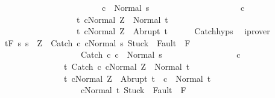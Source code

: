 \begin{isabellebody}
\ \ \ \ \ \ \ \ \ \ \ \ \ \ \ \ \ \ \ \ \ \ \ \ {\isasymGamma}{\isasymturnstile}c\ {\isasymdown}\ Normal\ s{\isacharbraceright}\ \isanewline
\ \ \ \ \ \ \ \ \ \ \ \ \ \ \ \ \ \ \ \ c\isanewline
\ \ \ \ \ \ \ \ \ \ \ \ \ \ \ \ \ \ {\isacharbraceleft}t{\isachardot}\ {\isasymGamma}{\isasymturnstile}{\isasymlangle}cNormal\ Z{\isasymrangle}\ {\isasymRightarrow}\ Normal\ t{\isacharbraceright}{\isacharcomma}\isanewline
\ \ \ \ \ \ \ \ \ \ \ \ \ \ \ \ \ \ {\isacharbraceleft}t{\isachardot}\ {\isasymGamma}{\isasymturnstile}{\isasymlangle}cNormal\ Z{\isasymrangle}\ {\isasymRightarrow}\ Abrupt\ t{\isacharbraceright}{\isachardoublequoteclose}\isanewline
\ \ \ \ \isamarkupfalse%
\ Catch{\isachardot}hyps\ \isamarkupfalse%
\ iprover\isanewline
\ \ \isamarkupfalse%
\ {\isachardoublequoteopen}{\isasymGamma}{\isacharcomma}{\isasymTheta}{\isasymturnstile}\isactrlsub t\isactrlbsub {\isacharslash}F\isactrlesub \ {\isacharbraceleft}s{\isachardot}\ s\ {\isacharequal}\ Z\ {\isasymand}\ {\isasymGamma}{\isasymturnstile}{\isasymlangle}Catch\ c\ cNormal\ s{\isasymrangle}\ {\isasymRightarrow}{\isasymnotin}{\isacharparenleft}{\isacharbraceleft}Stuck{\isacharbraceright}\ {\isasymunion}\ Fault\ {\isacharbackquote}\ {\isacharparenleft}{\isacharminus}F{\isacharparenright}{\isacharparenright}\ {\isasymand}\ \isanewline
\ \ \ \ \ \ \ \ \ \ \ \ \ \ \ \ \ \ \ {\isasymGamma}{\isasymturnstile}Catch\ c\ c\ {\isasymdown}\ Normal\ s{\isacharbraceright}\ \isanewline
\ \ \ \ \ \ \ \ \ \ \ \ \ \ \ \ c\isanewline
\ \ \ \ \ \ \ \ \ \ \ \ \ \ \ {\isacharbraceleft}t{\isachardot}\ {\isasymGamma}{\isasymturnstile}{\isasymlangle}Catch\ c\ cNormal\ Z{\isasymrangle}\ {\isasymRightarrow}\ Normal\ t{\isacharbraceright}{\isacharcomma}\isanewline
\ \ \ \ \ \ \ \ \ \ \ \ \ \ \ {\isacharbraceleft}t{\isachardot}\ {\isasymGamma}{\isasymturnstile}{\isasymlangle}cNormal\ Z{\isasymrangle}\ {\isasymRightarrow}\ Abrupt\ t\ {\isasymand}\ {\isasymGamma}{\isasymturnstile}c\ {\isasymdown}\ Normal\ t\ {\isasymand}\isanewline
\ \ \ \ \ \ \ \ \ \ \ \ \ \ \ \ \ \ \ {\isasymGamma}{\isasymturnstile}{\isasymlangle}cNormal\ t{\isasymrangle}\ {\isasymRightarrow}{\isasymnotin}{\isacharparenleft}{\isacharbraceleft}Stuck{\isacharbraceright}\ {\isasymunion}\ Fault\ {\isacharbackquote}\ {\isacharparenleft}{\isacharminus}F{\isacharparenright}{\isacharparenright}{\isacharbraceright}{\isachardoublequoteclose}\isanewline

\end{isabellebody}
